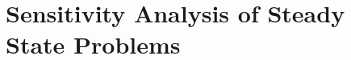 \begin{enumerate}
\end{enumerate}
%


\section{Sensitivity Analysis of Steady State Problems}
\label{sec:sensitivity_analysis_ssproblems}

